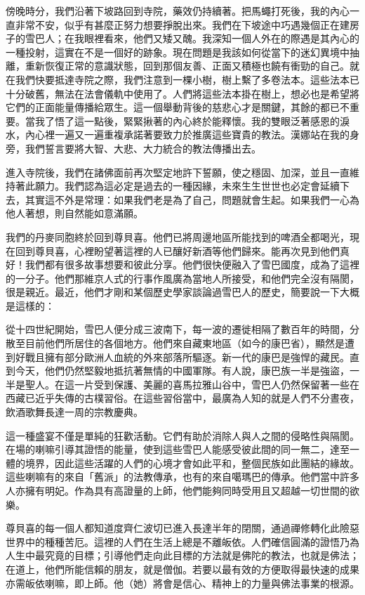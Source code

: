 傍晚時分，我們沿著下坡路回到寺院，藥效仍持續著。把馬蠅打死後，我的內心一直非常不安，似乎有甚麼正努力想要掙脫出來。我們在下坡途中巧遇幾個正在建房子的雪巴人；在我眼裡看來，他們又矮又醜。我深知一個人外在的際遇是其內心的一種投射，這實在不是一個好的跡象。現在問題是我該如何從當下的迷幻異境中抽離，重新恢復正常的意識狀態，回到那個友善、正面又積極也饒有衝勁的自己。就在我們快要抵達寺院之際，我們注意到一棵小樹，樹上繫了多卷法本。這些法本已十分破舊，無法在法會儀軌中使用了。人們將這些法本掛在樹上，想必也是希望將它們的正面能量傳播給眾生。這一個舉動背後的慈悲心才是關鍵，其餘的都已不重要。當我了悟了這一點後，緊緊揪著的內心終於能釋懷。我的雙眼泛著感恩的淚水，內心裡一遍又一遍重複承諾著要致力於推廣這些寶貴的教法。漢娜站在我的身旁，我們誓言要將大智、大悲、大力統合的教法傳播出去。

進入寺院後，我們在諸佛面前再次堅定地許下誓願，使之穩固、加深，並且一直維持著此願力。我們認為這必定是過去的一種因緣，未來生生世世也必定會延續下去，其實這不外是常理：如果我們老是為了自己，問題就會生起。如果我們一心為他人著想，則自然能如意滿願。

我們的丹麥同胞終於回到尊貝喜。他們已將周邊地區所能找到的啤酒全都喝光，現在回到尊貝喜，心裡盼望著這裡的人已釀好新酒等他們歸來。能再次見到他們真好！我們都有很多故事想要和彼此分享。他們很快便融入了雪巴國度，成為了這裡的一分子。他們那維京人式的行事作風廣為當地人所接受，和他們完全沒有隔閡，很是親近。最近，他們才剛和某個歷史學家談論過雪巴人的歷史，簡要說一下大概是這樣的：

從十四世紀開始，雪巴人便分成三波南下，每一波的遷徙相隔了數百年的時間，分散至目前他們所居住的各個地方。他們來自藏東地區（如今的康巴省），顯然是遭到好戰且擁有部分歐洲人血統的外來部落所驅逐。新一代的康巴是強悍的藏民。直到今天，他們仍然堅毅地抵抗著無情的中國軍隊。有人說，康巴族一半是強盜，一半是聖人。在這一片受到保護、美麗的喜馬拉雅山谷中，雪巴人仍然保留著一些在西藏已近乎失傳的古樸習俗。在這些習俗當中，最廣為人知的就是人們不分晝夜，飲酒歌舞長達一周的宗教慶典。

這一種盛宴不僅是單純的狂歡活動。它們有助於消除人與人之間的侵略性與隔閡。在場的喇嘛引導其證悟的能量，使到這些雪巴人能感受彼此間的同一無二，達至一體的境界，因此這些活躍的人們的心境才會如此平和，整個民族如此團結的緣故。這些喇嘛有的來自「舊派」的法教傳承，也有的來自噶瑪巴的傳承。他們當中許多人亦擁有明妃。作為具有高證量的上師，他們能夠同時受用且又超越一切世間的欲樂。

尊貝喜的每一個人都知道度齊仁波切已進入長達半年的閉關，通過禪修轉化此險惡世界中的種種苦厄。這裡的人們在生活上總是不離皈依。人們確信圓滿的證悟乃為人生中最究竟的目標；引導他們走向此目標的方法就是佛陀的教法，也就是佛法；在道上，他們所能信賴的朋友，就是僧伽。若要以最有效的方便取得最快速的成果亦需皈依喇嘛，即上師。他（她）將會是信心、精神上的力量與佛法事業的根源。

